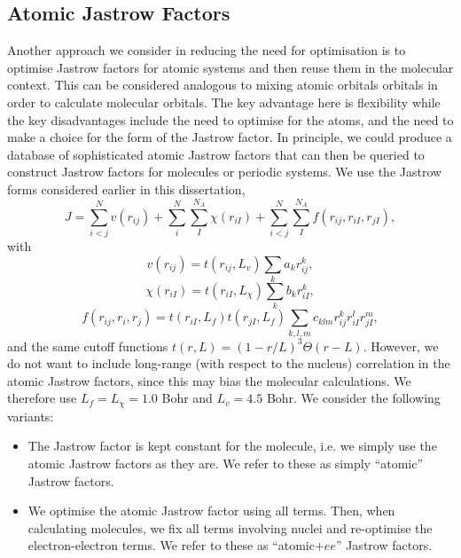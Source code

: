 \subsection{Atomic Jastrow Factors}

Another approach we consider in reducing the need for optimisation is to optimise Jastrow factors for atomic systems and then reuse them in the molecular context. This can be considered analogous to mixing atomic orbitals orbitals in order to calculate molecular orbitals. The key advantage here is flexibility while the key disadvantages include the need to optimise for the atoms, and the need to make a choice for the form of the Jastrow factor. In principle, we could produce a database of sophisticated atomic Jastrow factors that can then be queried to construct Jastrow factors for molecules or periodic systems. We use the Jastrow forms considered earlier in this dissertation, \begin{equation}
    \label{eq:jastrow-3}
    J = \sum_{i<j}^Nv(r_{ij}) + \sum_i^N\sum_I^{N_A}\chi(r_{iI}) + \sum_{i<j}^N\sum_I^{N_A}f(r_{ij}, r_{iI}, r_{jI}),
\end{equation}
with
\begin{equation}
    \label{eq:dtn-jastrow-ee-3}
    v(r_{ij})    = t(r_{ij},L_v)
                    \sum_{k} a_k r_{ij}^k ,
\end{equation}
\begin{equation}
    \label{eq:dtn-jastrow-en-3}
    \chi(r_{iI}) = t(r_{iI},L_\chi)
    \sum_{k} b_k r_{iI}^k ,
\end{equation}
\begin{equation}
    \label{eq:dtn-jastrow-een-3}
    f(r_{ij}, r_{i}, r_{j}) = t(r_{iI},L_f) t(r_{jI},L_f)
    \sum_{k,l,m} c_{klm}
    r_{ij}^k r_{iI}^l r_{jI}^m ,
\end{equation}
and the same cutoff functions $t(r,L) = (1-r/L)^3
\Theta(r-L)$. However, we do not want to include long-range (with respect to the nucleus) correlation in the atomic Jastrow factors, since this may bias the molecular calculations. We therefore use $L_f=L_\chi=1.0$ Bohr and $L_{v}=4.5$ Bohr. We consider the following variants:
\begin{itemize}
    \item The Jastrow factor is kept constant for the molecule, i.e. we simply use the atomic Jastrow factors as they are. We refer to these as simply ``atomic'' Jastrow factors.
    \item We optimise the atomic Jastrow factor using all terms. Then, when calculating molecules, we fix all terms involving nuclei and re-optimise the electron-electron terms. We refer to these as ``atomic$+ee$'' Jastrow factors.
\end{itemize}

